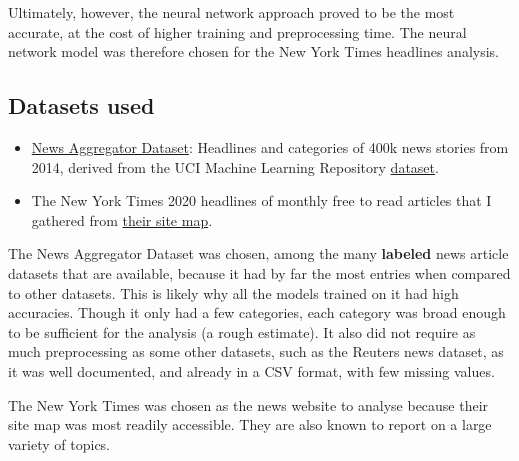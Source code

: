 \documentclass[11pt]{article}
\begin{document}
Ultimately, however, the neural network approach proved to be the most
accurate, at the cost of higher training and preprocessing time. The neural
network model was therefore chosen for the New York Times headlines analysis.

\subsection*{Datasets used}

\begin{itemize}
\item
\href{https://www.kaggle.com/uciml/news-aggregator-dataset}
{News Aggregator Dataset}:
Headlines and categories of 400k news stories from 2014,
derived from the UCI Machine Learning Repository
\href{http://archive.ics.uci.edu/ml/datasets/News+Aggregator}{dataset}.
\item
The New York Times 2020 headlines of monthly free to read articles that I
gathered from
\href{https://spiderbites.nytimes.com/2020/}
{their site map}.
\end{itemize}

The News Aggregator Dataset was chosen, among the many \textbf{labeled} news
article datasets that are available, because it had by far the most entries
when compared to other datasets. This is likely why all the models trained on
it had high accuracies. Though it only had a few categories, each category
was broad enough to be sufficient for the analysis (a rough estimate). It
also did not require as much preprocessing as some other datasets, such as
the Reuters news dataset, as it was well documented, and already in a CSV
format, with few missing values.

The New York Times was chosen as the news website to analyse because their
site map was most readily accessible. They are also known to report on a
large variety of topics.
\end{document}
